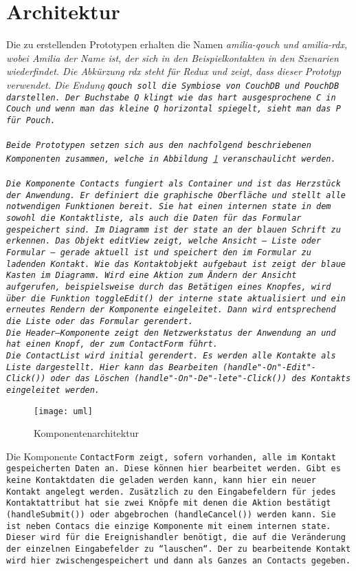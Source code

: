 \section{Architektur}
Die zu erstellenden Prototypen erhalten die Namen \it{amilia-qouch} und \it{amilia-rdx}, wobei Amilia der Name ist, der sich in den Beispielkontakten in den Szenarien wiederfindet. Die Abkürzung \it{rdx} steht für Redux und zeigt, dass dieser Prototyp  verwendet. Die Endung \tt{qouch} soll die Symbiose von CouchDB und PouchDB darstellen. Der Buchstabe Q klingt wie das hart ausgesprochene C in Couch und wenn man das kleine Q horizontal spiegelt, sieht man das P für Pouch.\\\\
Beide Prototypen setzen sich aus den nachfolgend beschriebenen Komponenten zusammen, welche in Abbildung \ref{fig:uml} veranschaulicht werden.\\\\
Die Komponente \tt{Contacts} fungiert als Container und ist das Herzstück der Anwendung. Er definiert die graphische Oberfläche und stellt alle notwendigen Funktionen bereit. Sie hat einen internen \tt{state} in dem sowohl die Kontaktliste, als auch die Daten für das Formular gespeichert sind. Im Diagramm ist der \tt{state} an der blauen Schrift zu erkennen. Das Objekt \tt{editView} zeigt, welche Ansicht -- Liste oder Formular -- gerade aktuell ist und speichert den im Formular zu ladenden Kontakt. Wie das Kontaktobjekt aufgebaut ist zeigt der blaue Kasten im Diagramm. Wird eine Aktion zum Ändern der Ansicht aufgerufen, beispielsweise durch das Betätigen eines Knopfes, wird über die Funktion \tt{toggleEdit()} der interne \tt{state} aktualisiert und ein erneutes Rendern der Komponente eingeleitet. Dann wird entsprechend die Liste oder das Formular gerendert.\\
Die \tt{Header}--Komponente zeigt den Netzwerkstatus der Anwendung an und hat einen Knopf, der zum \tt{ContactForm} führt.\\
Die \tt{ContactList} wird initial gerendert. Es werden alle Kontakte als Liste dargestellt. Hier kann das Bearbeiten (\tt{handle"-On"-Edit"-Click()}) oder das Löschen (\tt{handle"-On"-De"-lete"-Click()}) des Kontakts eingeleitet werden.
\begin{figure}[H]
  \texttt{[image: uml]}
  \grayRule
  \caption{Komponentenarchitektur}
  \label{fig:uml}
\end{figure}
Die Komponente \tt{ContactForm} zeigt, sofern vorhanden, alle im Kontakt gespeicherten Daten an. Diese können hier bearbeitet werden. Gibt es keine Kontaktdaten die geladen werden kann, kann hier ein neuer Kontakt angelegt werden. Zusätzlich zu den Eingabefeldern für jedes Kontaktattribut hat sie zwei Knöpfe mit denen die Aktion bestätigt (\tt{handleSubmit()}) oder abgebrochen (\tt{handleCancel()}) werden kann. Sie ist neben \tt{Contacs} die einzige Komponente mit einem internen \tt{state}. Dieser wird für die Ereignishandler benötigt, die auf die Veränderung der einzelnen Eingabefelder zu ``lauschen``. Der zu bearbeitende Kontakt wird hier zwischengespeichert und dann als Ganzes an \tt{Contacts} gegeben.\\
